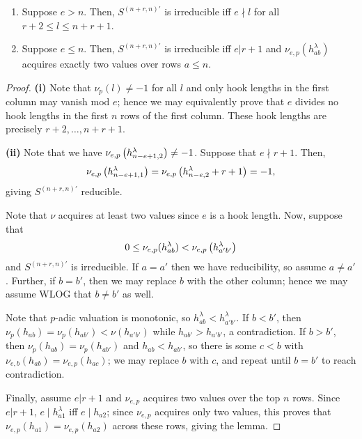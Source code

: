 \documentclass{amsart}
\begin{document}
\begin{lemma}\label{S irreducibility}
  \begin{enumerate}[label={(\roman*)}]
    Assume $e > 2$ and $n > 0$.
    \item Suppose $e > n$.
      Then, $S^{(n+r,n)'}$ is irreducible iff $e \nmid l$ for all $r + 2 \leq l \leq n + r + 1$.
    \item Suppose $e \leq n$.
      Then, $S^{(n+r,n)'}$ is irreducible iff $e | r + 1$ and $\nu_{e,p}(h_{ab}^\lambda)$ acquires exactly two values over rows $a \leq n$.
  \end{enumerate}  
\end{lemma}
\begin{proof}
  \textbf{(i)}
  Note that $\nu_p(l) \neq -1$ for all $l$ and only hook lengths in the first column may vanish mod $e$;
  hence we may equivalently prove that $e$ divides no hook lengths in the first $n$ rows of the first column.
  These hook lengths are precisely $r + 2,\dots,n+r+1$.

  \textbf{(ii)}
  Note that we have $\nu_{e,p}\left( h^\lambda_{n-e+1,2} \right) \neq -1$.
  Suppose that $e \nmid r + 1$.
  Then, \[\nu_{e,p}\left( h^\lambda_{n-e+1,1} \right) = \nu_{e,p}\left( h^\lambda_{n-e,2} + r + 1 \right) = -1,\]
  giving $S^{(n+r,n)'}$ reducible.

  Note that $\nu$ acquires at least two values since $e$ is a hook length.
  Now, suppose that \[0 \leq \nu_{e,p}(h^{\lambda}_{ab}) < \nu_{e,p}\left( h^{\lambda}_{a'b'} \right)\] and $S^{(n+r,n)'}$ is irreducible.
  If $a=a'$ then we have reducibility, so assume $a \neq a'$.
  Further, if $b = b'$, then we may replace $b$ with the other column;
  hence we may assume WLOG that $b \neq b'$ as well.

  Note that $p$-adic valuation is monotonic, so $h^\lambda_{ab} < h^\lambda_{a'b'}$.
  If $b < b'$, then $\nu_p(h_{ab}) = \nu_p(h_{ab'}) < \nu(h_{a'b'})$ while $h_{ab'} > h_{a'b'}$, a contradiction.
  If $b > b'$, then $\nu_p(h_{ab}) = \nu_p(h_{ab'})$ and $h_{ab} < h_{ab'}$, so there is some $c < b$ with $\nu_{e,b}(h_{ab}) = \nu_{e,p}(h_{ac})$; we may replace $b$ with $c$, and repeat until $b = b'$ to reach contradiction.

  Finally, assume $e | r + 1$ and $\nu_{e,p}$ acquires two values over the top $n$ rows.
  Since $e | r + 1$, $e \mid h_{a1}^\lambda$ iff $e \mid h_{a2}$;
  since $\nu_{e,p}$ acquires only two values, this proves that $\nu_{e,p}(h_{a1}) = \nu_{e,p}(h_{a2})$ across these rows, giving the lemma.
\end{proof}
\end{document}
